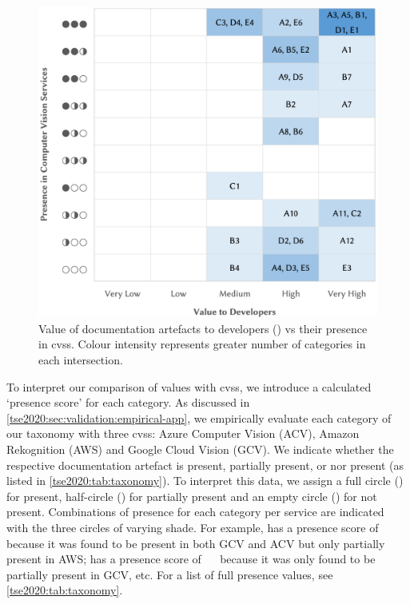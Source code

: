 \begin{figure}[h]
	\centering
  \includegraphics[width=.8\linewidth]{ips-vs-cvs2.png}
  \caption[Comparing value of API documentation artefacts to presence in Computer Vision Services]{Value of  documentation artefacts to developers () vs their presence in \glspl{cvs}. Colour intensity represents greater number of categories in each intersection.}
  \label{tse2020:fig:ips-vs-cvs}
\end{figure}

To interpret our comparison of  values with \glspl{cvs}, we introduce a calculated `presence score' for each category. As discussed in \cref{tse2020:sec:validation:empirical-app}, we empirically evaluate each category of our taxonomy with three \glspl{cvs}: Azure Computer Vision (ACV), Amazon Rekognition (AWS) and Google Cloud Vision (GCV). We indicate whether the respective  documentation artefact is present, partially present, or nor present (as listed in \cref{tse2020:tab:taxonomy}). To interpret this data, we assign a full circle (\circlepresent{}) for present, half-circle (\circlepartialpresent{}) for partially present and an empty circle (\circlenotpresent{}) for not present. Combinations of presence for each category per service are indicated with the three circles of varying shade. For example,  has a presence score of {\small \circlepresent{}~\circlepresent{}~\circlepartialpresent{}} because it was found to be present in both GCV and ACV but only partially present in AWS;  has a presence score of {\small \circlepartialpresent{}~\circlenotpresent{}~\circlenotpresent{}} because it was only found to be partially present in GCV, etc. For a list of full presence values, see \cref{tse2020:tab:taxonomy}.


